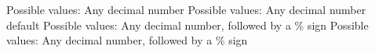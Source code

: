 \documentclass{article}
\begin{document}


 \newline
\indent Possible values: \newline
\indent\indent Any decimal number \newline\newline
{} \newline
\indent  Possible values: \newline
\indent\indent  Any decimal number \newline
\indent\indent  default \newline\newline
{} \newline
\indent  Possible values: \newline
\indent\indent  Any decimal number, followed by a \% sign \newline\newline
{} \newline
\indent  Possible values: \newline
\indent\indent  Any decimal number, followed by a \% sign \newline


 
\end{document}
